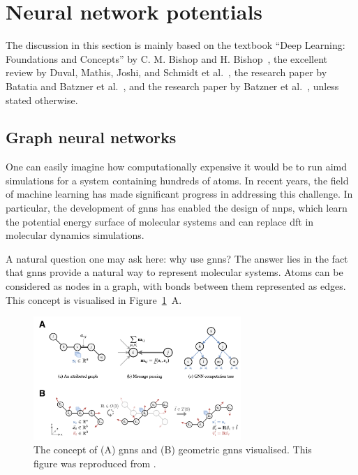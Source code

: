 \section{Neural network potentials}
The discussion in this section is mainly based on the textbook ``Deep Learning: Foundations and Concepts'' by C. M. Bishop and H. Bishop~\citep{bishopDeepLearningFoundations2023}, the excellent review by Duval, Mathis, Joshi, and Schmidt et al.~\citep{duvalHitchhikersGuideGeometric2024}, the research paper by Batatia and Batzner et al.~\citep{batatiaDesignSpaceE3Equivariant2022}, and the research paper by Batzner et al.~\citep{batznerE3equivariantGraphNeural2022}, unless stated otherwise.

\subsection{Graph neural networks}
One can easily imagine how computationally expensive it would be to run \ac{aimd} simulations for a system containing hundreds of atoms. In recent years, the field of machine learning has made significant progress in addressing this challenge. In particular, the development of \acp{gnn} has enabled the design of \acp{nnp}, which learn the potential energy surface of molecular systems and can replace \ac{dft} in molecular dynamics simulations.

A natural question one may ask here: why use \acp{gnn}? The answer lies in the fact that \acp{gnn} provide a natural way to represent molecular systems. Atoms can be considered as nodes in a graph, with bonds between them represented as edges. This concept is visualised in Figure~\ref{fig:graph_and_geometric_nns}~A.

\begin{figure}[b!]
    \centering
    \includegraphics[width=0.7\textwidth]{Figures/2_Theory/graph_and_geometric_nns.png}
    \caption{The concept of (A) \acp{gnn} and (B) geometric \acp{gnn} visualised. This figure was reproduced from \citep{duvalHitchhikersGuideGeometric2024}.}
    \label{fig:graph_and_geometric_nns}
\end{figure}

